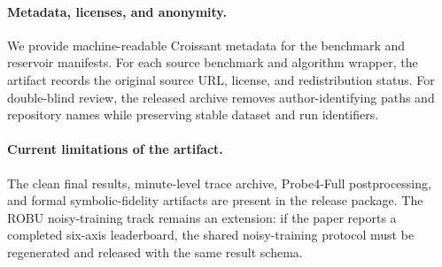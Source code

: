 \paragraph{Metadata, licenses, and anonymity.}
We provide machine-readable Croissant metadata for the \core{} benchmark and reservoir manifests. For each source benchmark and algorithm wrapper, the artifact records the original source URL, license, and redistribution status. For double-blind review, the released archive removes author-identifying paths and repository names while preserving stable dataset and run identifiers.

\paragraph{Current limitations of the artifact.}
The clean \core{} final results, minute-level trace archive, Probe4-Full postprocessing, and formal symbolic-fidelity artifacts are present in the release package. The ROBU noisy-training track remains an extension: if the paper reports a completed six-axis leaderboard, the shared noisy-training protocol must be regenerated and released with the same result schema.
